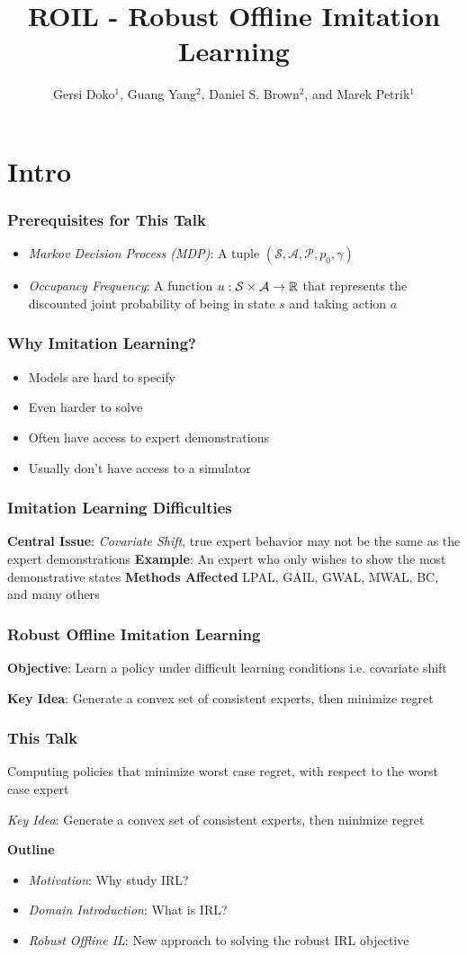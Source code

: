 \documentclass{beamer}
\title{ROIL - Robust Offline Imitation Learning}
\author{Gersi Doko$^1$, Guang Yang$^2$, Daniel S. Brown$^2$, and Marek Petrik$^1$}
\institute{Department of Computer Science \\ $1$ University of New Hampshire \\ $2$ University of Utah}
\date{}
\begin{document}
\frame{\titlepage}

\section*{Intro}


\begin{frame}
	\frametitle{Prerequisites for This Talk}
	\begin{itemize}
		\item \emph{Markov Decision Process (MDP)}: A tuple $(\mathcal{S}, \mathcal{A}, \mathcal{P}, p_0, \gamma)$
		\item \emph{Occupancy Frequency}: A function $u : \mathcal{S} \times \mathcal{A} \to \mathbb{R}$ that represents the discounted joint probability of being in state $s$ and taking action $a$
	\end{itemize}
\end{frame}

\begin{frame}
\frametitle{Why Imitation Learning?}
	\begin{itemize}
		\item Models are hard to specify
		\item Even harder to solve
		\item Often have access to expert demonstrations
		\item Usually don't have access to a simulator
	\end{itemize}
\end{frame}

\begin{frame}
	\frametitle{Imitation Learning Difficulties}
	\textbf{Central Issue}: \emph{Covariate Shift}, true expert behavior may not be the same as the expert demonstrations
	\vfill
	\textbf{Example}: An expert who only wishes to show the most demonstrative states
	\vfill
	\textbf{Methods Affected} LPAL, GAIL, GWAL, MWAL, BC, and many others
\end{frame}

\begin{frame}
	\frametitle{Robust Offline Imitation Learning}
	\textbf{Objective}: Learn a policy under difficult learning conditions i.e. covariate shift

	\vfill

	\textbf{Key Idea}: Generate a convex set of consistent experts, then minimize regret
\end{frame}

\begin{frame}
	\frametitle{This Talk}
	Computing policies that minimize worst case regret, with respect to the worst case expert

	\vfill
	\emph{Key Idea}: Generate a convex set of consistent experts, then minimize regret

	\textbf{Outline}
	\begin{itemize}
	\item \emph{Motivation}: Why study IRL?
	\item \emph{Domain Introduction}: What is IRL?
	\item \emph{Robust Offline IL}: New approach to solving the robust IRL objective
	\end{itemize}
\end{frame}
\end{document}
